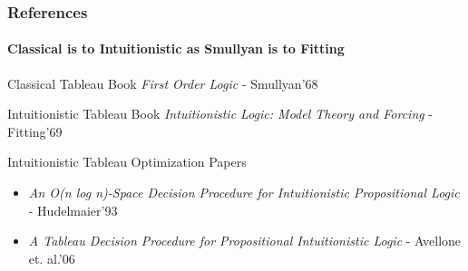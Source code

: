 \documentclass[mathserif]{beamer}
\begin{document}
\begin{frame}
\frametitle{References}
\framesubtitle{Classical is to Intuitionistic as Smullyan is to Fitting}

\begin{block}{Classical Tableau Book}
{\it First Order Logic} - Smullyan'68
\end{block}

\begin{block}{Intuitionistic Tableau Book}
{\it Intuitionistic Logic: Model Theory and Forcing} - Fitting'69
\end{block}

\begin{block}{Intuitionistic Tableau Optimization Papers}
\begin{itemize}
\item {\it An O(n log n)-Space Decision Procedure for Intuitionistic Propositional Logic} - Hudelmaier'93
\item {\it A Tableau Decision Procedure for Propositional Intuitionistic Logic} - Avellone et. al.'06
\end{itemize}
\end{block}

\end{frame}
\end{document}
